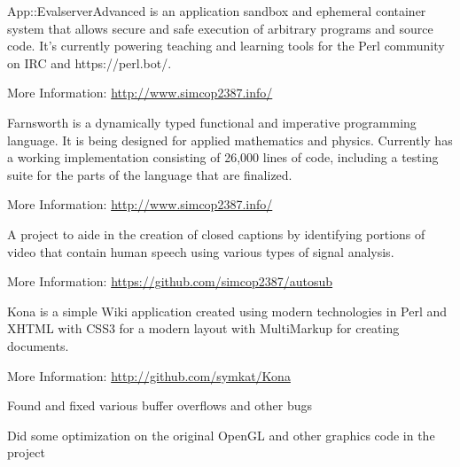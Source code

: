 \documentclass[table,tmargin=1in,bmargin=1in,letterpaper]{resume}
\begin{document}
\begin{compactitem}
\item App::EvalserverAdvanced is an application sandbox and ephemeral container system that allows secure and safe execution of arbitrary programs and source code.  It's currently powering teaching and learning tools for the Perl community on IRC and https://perl.bot/. 
\item More Information: \url{http://www.simcop2387.info/}
\end{compactitem}

\begin{compactitem}
\item Farnsworth is a dynamically typed functional and imperative programming language.  
It is being designed for applied mathematics and physics.  Currently has a working implementation 
consisting of 26,000 lines of code, including a testing suite for the parts of the language that are finalized.
\item More Information: \url{http://www.simcop2387.info/}
\end{compactitem}


\begin{compactitem}
\item A project to aide in the creation of closed captions by identifying portions of 
video that contain human speech using various types of signal analysis.
\item More Information: \url{https://github.com/simcop2387/autosub}
\end{compactitem}


\begin{compactitem}
\item Kona is a simple Wiki application created using modern technologies in Perl and XHTML 
with CSS3 for a modern layout with MultiMarkup for creating documents.
\item More Information: \url{http://github.com/symkat/Kona}
\end{compactitem}


\begin{compactitem}
\item Found and fixed various buffer overflows and other bugs
\item Did some optimization on the original OpenGL and other graphics code in the project
\end{compactitem}
\end{document}

